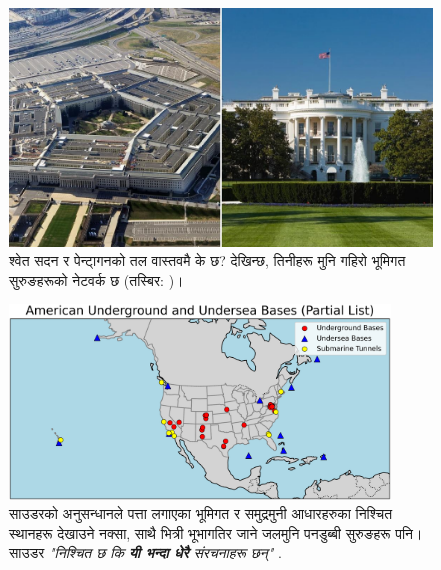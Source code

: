\documentclass[10pt,twocolumn,letterpaper]{article}
\begin{document}
\begin{figure}[b]

\begin{center}
   \includegraphics[width=1\linewidth]{penta.jpg}
\end{center}
   \caption{श्वेत सदन र पेन्टा्गनको तल वास्तवमै के छ? देखिन्छ, तिनीहरू मुनि गहिरो भूमिगत सुरुङहरूको नेटवर्क छ (तस्बिर: \cite{31})।}
\label{fig:3}
\label{fig:onecol}
\end{figure}
\begin{figure}[t]
\begin{center}
\includegraphics[width=0.9\textwidth]{basescrop.png}
\end{center}
   \caption{साउडरको अनुसन्धानले पत्ता लगाएका भूमिगत र समुद्रमुनी आधारहरुका निश्चित स्थानहरू देखाउने नक्सा, साथै भित्री भूभागतिर जाने जलमुनि पनडुब्बी सुरुङहरू पनि। साउडर \textit{"निश्चित छ कि \textbf{यी भन्दा धेरै} संरचनाहरू छन्"} \cite{22}.}
   \label{fig:4}
\end{figure}
\end{document}
